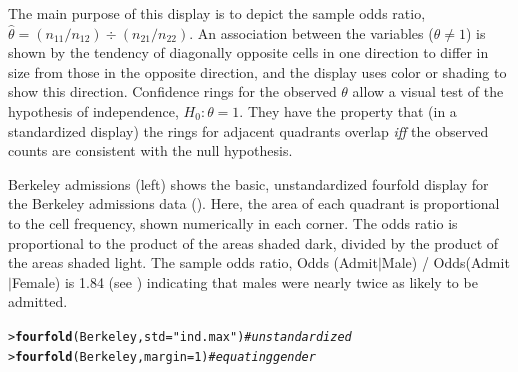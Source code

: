 \documentclass[10pt,krantz2]{krantz}\usepackage[]{graphicx}\usepackage[]{color}
\makeatletter
\newcommand{\hlnum}[1]{\textcolor[rgb]{0.686,0.059,0.569}{#1}}%
\newcommand{\hlstr}[1]{\textcolor[rgb]{0.192,0.494,0.8}{#1}}%
\newcommand{\hlcom}[1]{\textcolor[rgb]{0.678,0.584,0.686}{\textit{#1}}}%
\newcommand{\hlstd}[1]{\textcolor[rgb]{0.345,0.345,0.345}{#1}}%
\newcommand{\hlkwc}[1]{\textcolor[rgb]{0.333,0.667,0.333}{#1}}%
\newcommand{\hlkwd}[1]{\textcolor[rgb]{0.737,0.353,0.396}{\textbf{#1}}}%
\newenvironment{kframe}{%
 \def\at@end@of@kframe{}%
 \ifinner\ifhmode%
  \def\at@end@of@kframe{\end{minipage}}%
  \begin{minipage}{\columnwidth}%
 \fi\fi%
 \def\FrameCommand##1{\hskip\@totalleftmargin \hskip-\fboxsep
 \colorbox{shadecolor}{##1}\hskip-\fboxsep
     \hskip-\linewidth \hskip-\@totalleftmargin \hskip\columnwidth}%
 \MakeFramed {\advance\hsize-\width
   \@totalleftmargin\z@ \linewidth\hsize
   \@setminipage}}%
 {\par\unskip\endMakeFramed%
 \at@end@of@kframe}
\newenvironment{knitrout}{}{} %
\renewenvironment{knitrout}{\small\renewcommand{\baselinestretch}{.85}}{} %
\makeatother
\begin{document}
The main purpose of this display is to depict the sample odds ratio,
\(\hat{\theta} = (n_{11} /  n_{12} )
\div  (n_{21} /  n_{22} )\).
An association between the variables
(\(\theta \neq 1\)) is shown by the tendency of diagonally opposite
cells in one direction to differ in size from those in the opposite
direction, and the display uses color or shading to show this
direction.  Confidence rings for the observed \(\theta\) allow a
visual test of the hypothesis of independence,
 \(H_0 :  \theta  =  1\).  They have
the property that (in a standardized display) the rings for adjacent quadrants overlap \emph{iff}
the observed counts are consistent with the null hypothesis.

\begin{Example}[berkeley2]{Berkeley admissions}
(left) shows the basic, unstandardized
fourfold display for the
Berkeley admissions data ().
Here, the area of each quadrant is proportional to the cell frequency,
shown numerically in each corner.
The odds ratio is proportional to the product of the areas
shaded dark, divided by the product of the areas shaded light.
The sample odds ratio, Odds (Admit\(|\)Male) / Odds(Admit\(|\)Female) is
1.84 (see )
indicating that males were nearly twice as likely to be admitted.

\begin{knitrout}
\color{fgcolor}\begin{kframe}
\begin{alltt}
\hlstd{> }\hlkwd{fourfold}\hlstd{(Berkeley,} \hlkwc{std} \hlstd{=} \hlstr{"ind.max"}\hlstd{)}   \hlcom{# unstandardized}
\hlstd{> }\hlkwd{fourfold}\hlstd{(Berkeley,} \hlkwc{margin} \hlstd{=} \hlnum{1}\hlstd{)}        \hlcom{# equating gender}
\end{alltt}
\end{kframe}\begin{figure}[!htbp]


\end{figure}
\end{knitrout}
\end{Example}
\end{document}
